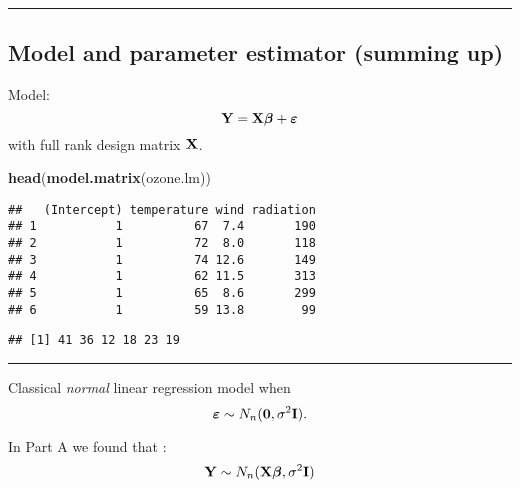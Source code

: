 \documentclass[]{article}
\newenvironment{Shaded}{\begin{snugshade}}{\end{snugshade}}
\newcommand{\KeywordTok}[1]{\textcolor[rgb]{0.13,0.29,0.53}{\textbf{#1}}}
\newcommand{\NormalTok}[1]{#1}
\newcommand{\OperatorTok}[1]{\textcolor[rgb]{0.81,0.36,0.00}{\textbf{#1}}}
\begin{document}
\begin{center}\rule{0.5\linewidth}{\linethickness}\end{center}

\hypertarget{model-and-parameter-estimator-summing-up}{%
\subsection{Model and parameter estimator (summing
up)}\label{model-and-parameter-estimator-summing-up}}

Model: \[{\bf Y}=\bf X \boldsymbol{\beta}+{\boldsymbol{\varepsilon}}\]
with full rank design matrix \({\bf X}\).

\small

\begin{Shaded}
\begin{Highlighting}[]
\KeywordTok{head}\NormalTok{(}\KeywordTok{model.matrix}\NormalTok{(ozone.lm))}
\end{Highlighting}
\end{Shaded}

\begin{verbatim}
##   (Intercept) temperature wind radiation
## 1           1          67  7.4       190
## 2           1          72  8.0       118
## 3           1          74 12.6       149
## 4           1          62 11.5       313
## 5           1          65  8.6       299
## 6           1          59 13.8        99
\end{verbatim}

\begin{Shaded}
\end{Shaded}

\begin{verbatim}
## [1] 41 36 12 18 23 19
\end{verbatim}

\normalsize

\begin{center}\rule{0.5\linewidth}{\linethickness}\end{center}

Classical \emph{normal} linear regression model when
\[\boldsymbol{\varepsilon}\sim N_n({\bf 0},\sigma^2{\bf I}).\]

In Part A we found that :
\[ {\bf Y} \sim N_{n}({\bf X} {\boldsymbol\beta},\sigma^2 {\bf I})\]
\end{document}
